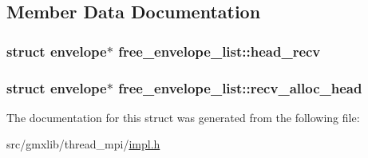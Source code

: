 \subsection{\-Member \-Data \-Documentation}
\hypertarget{structfree__envelope__list_a39e728209784c57a78e59a530b968db4}{
\subsubsection[{head\-\_\-recv}]{\setlength{\rightskip}{0pt plus 5cm}struct {\bf envelope}$\ast$ {\bf free\-\_\-envelope\-\_\-list\-::head\-\_\-recv}}}\label{structfree__envelope__list_a39e728209784c57a78e59a530b968db4}
\hypertarget{structfree__envelope__list_a73877606aab25da40236de6fd8fba6a2}{
\subsubsection[{recv\-\_\-alloc\-\_\-head}]{\setlength{\rightskip}{0pt plus 5cm}struct {\bf envelope}$\ast$ {\bf free\-\_\-envelope\-\_\-list\-::recv\-\_\-alloc\-\_\-head}}}\label{structfree__envelope__list_a73877606aab25da40236de6fd8fba6a2}


\-The documentation for this struct was generated from the following file\-:\begin{DoxyCompactItemize}
\item 
src/gmxlib/thread\-\_\-mpi/\hyperlink{impl_8h}{impl.\-h}\end{DoxyCompactItemize}
